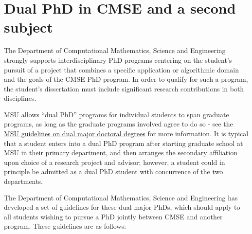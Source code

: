 \section{Dual PhD in CMSE and a second subject}
\label{sec:dual_phd}

The Department of Computational Mathematics, Science and Engineering
strongly supports interdisciplinary PhD programs centering on the
student's pursuit of a project that combines a specific application or
algorithmic domain and the goals of the CMSE PhD program.  In order to
qualify for such a program, the student's dissertation must include
significant research contributions in both disciplines.

MSU allows ``dual PhD'' programs for individual students to span
graduate programs, as long as the graduate programs involved agree to
do so - see the
\href{https://reg.msu.edu/AcademicPrograms/Text.asp?Section=111#s407}{MSU
  guidelines on dual major doctoral degrees} for more information.  It
is typical that a student enters into a dual PhD program after
starting graduate school at MSU in their primary department, and then
arranges the secondary affiliation upon choice of a research project
and advisor; however, a student could in principle be admitted as a
dual PhD student with concurrence of the two departments.

The Department of Computational Mathematics, Science and Engineering
has developed a set of guidelines for these dual major PhDs, which
should apply to all students wishing to pursue a PhD jointly between
CMSE and another program.  These guidelines are as follows:

